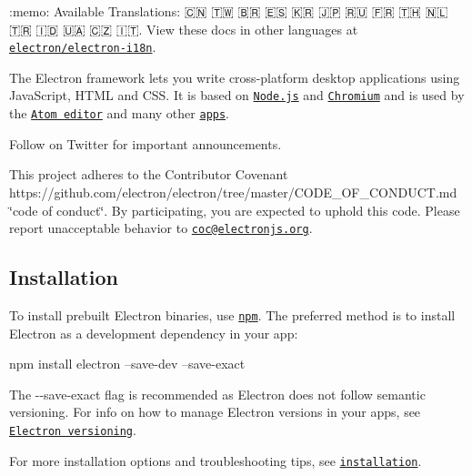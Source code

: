 \href{https://electronjs.org}{\tt }

\href{https://travis-ci.org/electron/electron}{\tt } \href{https://ci.appveyor.com/project/electron-bot/electron/branch/master}{\tt } \href{https://david-dm.org/electron/electron?type=dev}{\tt } \href{https://atom-slack.herokuapp.com/}{\tt }

\+:memo\+: Available Translations\+: 🇨🇳 🇹🇼 🇧🇷 🇪🇸 🇰🇷 🇯🇵 🇷🇺 🇫🇷 🇹🇭 🇳🇱 🇹🇷 🇮🇩 🇺🇦 🇨🇿 🇮🇹. View these docs in other languages at \href{https://github.com/electron/electron-i18n/tree/master/content/}{\tt electron/electron-\/i18n}.

The Electron framework lets you write cross-\/platform desktop applications using Java\+Script, H\+T\+ML and C\+SS. It is based on \href{https://nodejs.org/}{\tt Node.\+js} and \href{https://www.chromium.org}{\tt Chromium} and is used by the \href{https://github.com/atom/atom}{\tt Atom editor} and many other \href{https://electronjs.org/apps}{\tt apps}.

Follow \href{https://twitter.com/electronjs}{\tt } on Twitter for important announcements.

This project adheres to the Contributor Covenant https\+://github.com/electron/electron/tree/master/\+C\+O\+D\+E\+\_\+\+O\+F\+\_\+\+C\+O\+N\+D\+U\+C\+T.\+md \char`\"{}code of conduct\char`\"{}. By participating, you are expected to uphold this code. Please report unacceptable behavior to \href{mailto:coc@electronjs.org}{\tt coc@electronjs.\+org}.

\subsection*{Installation}

To install prebuilt Electron binaries, use \href{https://docs.npmjs.com/}{\tt {\ttfamily npm}}. The preferred method is to install Electron as a development dependency in your app\+:


\begin{DoxyCode}
npm install electron --save-dev --save-exact
\end{DoxyCode}


The {\ttfamily -\/-\/save-\/exact} flag is recommended as Electron does not follow semantic versioning. For info on how to manage Electron versions in your apps, see \href{https://electronjs.org/docs/tutorial/electron-versioning}{\tt Electron versioning}.

For more installation options and troubleshooting tips, see \href{https://electronjs.org/docs/tutorial/installation}{\tt installation}.

